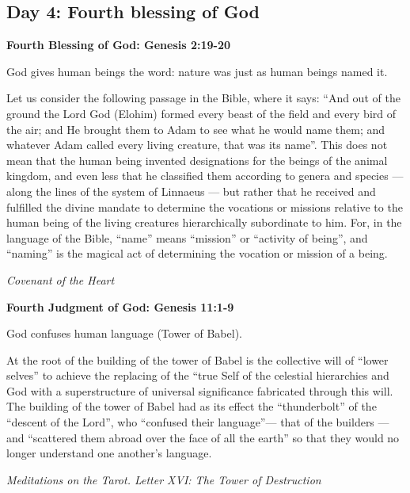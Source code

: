 \subsection*{Day 4: Fourth blessing of God}
\textbf{Fourth Blessing of God: Genesis 2:19-20}

God gives human beings the word: nature was just as human beings named it.

\begin{quotationx}
Let us consider the following passage in the Bible, where it says: “And out of the ground the Lord God (Elohim) formed
every beast of the field and every bird of the air; and He brought them to Adam to see what he would name them; and
whatever Adam called every living creature, that was its name”. This does not mean that the human being invented
designations for the beings of the animal kingdom, and even less that he classified them according to genera and
species — along the lines of the system of Linnaeus — but rather that he
received and fulfilled the divine mandate to determine the vocations or missions relative to the human being of the
living creatures hierarchically subordinate to him. For, in the language of the Bible, “name” means “mission” or
“activity of being”, and “naming” is the magical act of determining the vocation or mission of a being. \begin{flushright}
\emph{Covenant of the Heart}\end{flushright}

\end{quotationx}
\textbf{Fourth Judgment of God: Genesis 11:1-9}

God confuses human language (Tower of Babel).

\begin{quotationx}
At the root of the building of the tower of Babel is the collective will of “lower selves” to achieve the replacing of
the “true Self of the celestial hierarchies and God with a superstructure of universal significance fabricated through
this will. The building of the tower of Babel had as its effect the “thunderbolt” of the “descent of the Lord”, who
“confused their language”— that of the builders —and “scattered them abroad
over the face of all the earth” so that they would no longer understand one another's language.
\begin{flushright} \emph{Meditations on the Tarot. Letter XVI: The Tower of Destruction}\end{flushright}

\end{quotationx}

